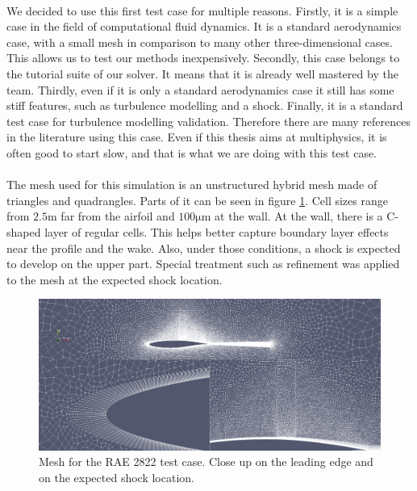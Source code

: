         \paragraph{}
        We decided to use this first test case for multiple reasons.
        Firstly, it is a simple case in the field of computational fluid dynamics.
        It is a standard aerodynamics case, with a small mesh in comparison to many other three-dimensional cases.
        This allows us to test our methods inexpensively.
        Secondly, this case belongs to the tutorial suite of our solver.
        It means that it is already well mastered by the team.
        Thirdly, even if it is only a standard aerodynamics case it still has some stiff features, such as turbulence modelling and a shock.
        Finally, it is a standard test case for turbulence modelling validation.
        Therefore there are many references in the literature using this case.
        Even if this thesis aims at multiphysics, it is often good to start slow, and that is what we are doing with this test case.

        \paragraph{}
        The mesh used for this simulation is an unstructured hybrid mesh made of triangles and quadrangles.
        Parts of it can be seen in figure \ref{fig:rae_mesh}.
        Cell sizes range from $2.5\si{\meter}$ far from the airfoil and $100\si{\micro\meter}$ at the wall.
        At the wall, there is a C-shaped layer of regular cells.
        This helps better capture boundary layer effects near the profile and the wake.
        Also, under those conditions, a shock is expected to develop on the upper part.
        Special treatment such as refinement was applied to the mesh at the expected shock location.

        \begin{figure}
          \centering
          \includegraphics[width=\textwidth]{figures/rae_mesh.png}
          \caption{Mesh for the RAE 2822 test case. Close up on the leading edge and on the expected shock location.}
          \label{fig:rae_mesh}
        \end{figure}

